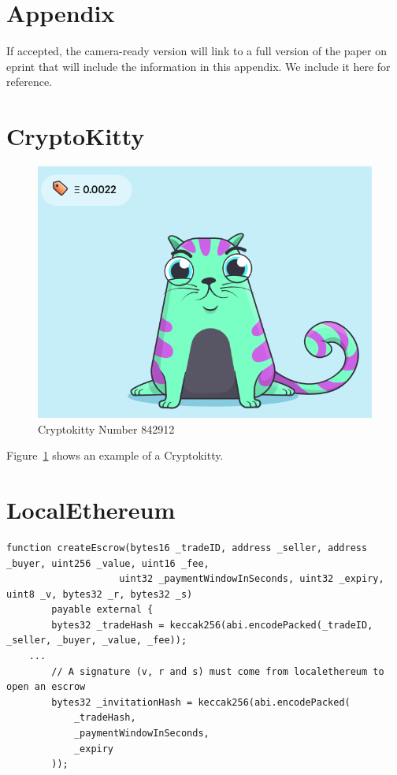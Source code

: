
\clearpage
\section{Appendix}
\appendix

 If accepted, the camera-ready version will link to a full version of the paper on eprint that will include the information in this appendix. We include it here for reference.

\section{CryptoKitty} \label{app:cryptokitty}

\begin{figure}[!htb]
\centering
\includegraphics[width=0.3\linewidth]{figures/cryptokittie842912.png}
\caption{ Cryptokitty Number 842912 \label{fig:cryptokittie}}
\end{figure}

Figure~\ref{fig:cryptokittie} shows an example of a Cryptokitty.


\section{LocalEthereum} \label{app:localethereum}

\begin{lstlisting}[basicstyle=\scriptsize\ttfamily,caption={Code snippet from LocalEthereum smart contract. Values V,R and S are set by LocalEtherem to have a valid signature, also the tradeHash uses buyer and seller addresses, mitigating the possibility of front-running by a third party.},label={code:localethereum}]
    function createEscrow(bytes16 _tradeID, address _seller, address _buyer, uint256 _value, uint16 _fee,
					uint32 _paymentWindowInSeconds, uint32 _expiry, uint8 _v, bytes32 _r, bytes32 _s) 
        payable external {
        bytes32 _tradeHash = keccak256(abi.encodePacked(_tradeID, _seller, _buyer, _value, _fee));
	...
        // A signature (v, r and s) must come from localethereum to open an escrow
        bytes32 _invitationHash = keccak256(abi.encodePacked(
            _tradeHash,
            _paymentWindowInSeconds,
            _expiry
        )); 
\end{lstlisting}

